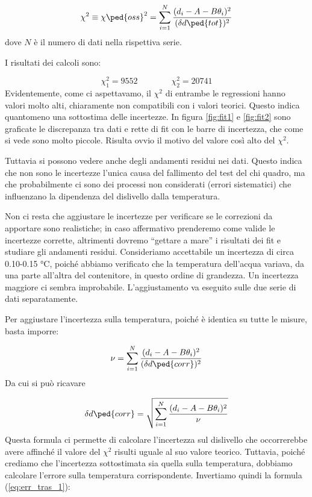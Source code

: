 \begin{equation}
    \chi^2 \equiv \chi\ped{oss}^2 = \sum_{i=1}^{N} \frac{(d_i - A - B\theta_i)^2}{(\delta d\ped{tot})^2}
    \label{eq:chi2}
\end{equation}
%
dove $N$ è il numero di dati nella rispettiva serie. 

I risultati dei calcoli sono:

\begin{equation}
    \chi_1^2 = 9552 \qquad \qquad \chi_2^2 = 20741
\end{equation}
%
Evidentemente, come ci aspettavamo, il $\chi^2$ di entrambe le regressioni hanno valori molto alti, chiaramente non compatibili con
i valori teorici. Questo indica quantomeno una sottostima delle incertezze. In figura \ref{fig:fit1} e \ref{fig:fit2} sono
graficate le discrepanza tra dati e rette di fit con le barre di incertezza, che come si vede sono molto piccole. Risulta ovvio il motivo del
valore così alto del $\chi^2$.

Tuttavia si possono vedere anche degli andamenti residui nei dati. Questo indica che non sono le incertezze l'unica
causa del fallimento del test del chi quadro, ma che probabilmente ci sono dei processi non considerati (errori sistematici)
che influenzano la dipendenza del dislivello dalla temperatura.

Non ci resta che aggiustare le incertezze per verificare se le correzioni da apportare sono realistiche; in caso affermativo
prenderemo come valide le incertezze corrette, altrimenti dovremo ``gettare a mare'' i risultati dei fit e studiare gli
andamenti residui.
Consideriamo accettabile un incertezza di circa 0.10-0.15 \si{\celsius}, poiché abbiamo verificato che la temperatura dell'acqua
variava, da una parte all'altra del contenitore, in questo ordine di grandezza. Un incertezza maggiore ci sembra improbabile.
L'aggiustamento va eseguito sulle due serie di dati separatamente.

Per aggiustare l'incertezza sulla temperatura, poiché è identica su tutte le misure, basta imporre:

\begin{equation}
    \nu = \sum_{i=1}^{N} \frac{(d_i - A - B\theta_i)^2}{(\delta d\ped{corr})^2}
\end{equation}
%
Da cui si può ricavare

\begin{equation}
    \delta d\ped{corr} = \sqrt{\sum_{i=1}^{N} \frac{(d_i - A - B\theta_i)^2}{\nu}}
    \label{eq:corr_err}
\end{equation}
%
Questa formula ci permette di calcolare l'incertezza sul dislivello che occorrerebbe avere affinché il valore del $\chi^2$
risulti uguale al suo valore teorico. Tuttavia, poiché crediamo che l'incertezza sottostimata sia quella sulla temperatura,
dobbiamo calcolare l'errore sulla temperatura corrispondente. Invertiamo quindi la formula (\ref{eq:err_tras_1}):

